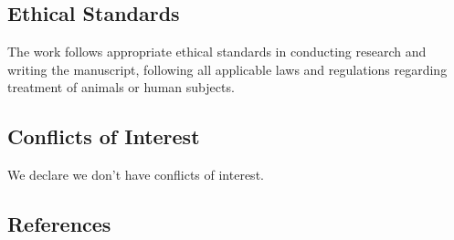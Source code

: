\documentclass{article}
\begin{document}
\subsection{Ethical Standards}

The work follows appropriate ethical standards in conducting research and writing the manuscript, following all applicable laws and regulations regarding treatment of animals or human subjects.

\subsection{Conflicts of Interest}

We declare we don't have conflicts of interest.

\subsection{References}
\end{document}
